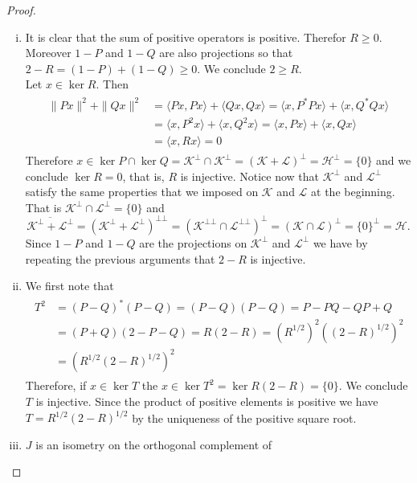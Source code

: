\begin{proof}
\begin{enumerate}[(i)]
\item It is clear that the sum of positive operators is positive. Therefor $R\geq 0$. Moreover $1-P$ and $1-Q$ are also projections so that $2-R=(1-P)+(1-Q)\geq 0$. We conclude $2\geq R$. \\
Let $x\in\ker R$. Then
\begin{align}
\begin{split}
\|Px\|^2+\|Qx\|^2&=\langle Px,Px \rangle + \langle Qx,Qx\rangle = \langle x,P^*Px\rangle +\langle x, Q^*Qx\rangle \\
&=\langle x, P^2x\rangle + \langle x, Q^2x\rangle = \langle x,Px\rangle + \langle x,Qx\rangle \\
&=\langle x,Rx\rangle = 0
\end{split}
\end{align}
Therefore $x\in\ker P\cap\ker Q=\mathcal{K}^\bot\cap\mathcal{K}^\bot=(\mathcal{K}+\mathcal{L})^\bot=\mathcal{H}^\bot=\{0\}$ and we conclude $\ker R = {0}$, that is, $R$ is injective. Notice now that $\mathcal{K}^\bot$ and $\mathcal{L}^\bot$ satisfy the same properties that we imposed on $\mathcal{K}$ and $\mathcal{L}$ at the beginning. That is $\mathcal{K}^\bot\cap\mathcal{L}^\bot=\{0\}$ and
\begin{equation}
\overline{\mathcal{K}^\bot+\mathcal{L}^\bot}=(\mathcal{K}^\bot+\mathcal{L}^\bot)^{\bot\bot}=(\mathcal{K}^{\bot\bot}\cap\mathcal{L}^{\bot\bot})^\bot = (\mathcal{K}\cap\mathcal{L})^\bot=\{0\}^\bot = \mathcal{H}.
\end{equation}
Since $1-P$ and $1-Q$ are the projections on $\mathcal{K}^\bot$ and $\mathcal{L}^\bot$ we have by repeating the previous arguments that $2-R$ is injective.
\item We first note that 
\begin{align}
\begin{split}
T^2&=(P-Q)^*(P-Q)=(P-Q)(P-Q)=P-PQ-QP+Q \\
&=(P+Q)(2-P-Q)=R(2-R)=(R^{1/2})^2((2-R)^{1/2})^2 \\
&=(R^{1/2}(2-R)^{1/2})^2
\end{split}
\end{align}
Therefore, if $x\in \ker T$ the $x\in\ker T^2=\ker R(2-R)=\{0\}$. We conclude $T$ is injective. Since the product of positive elements is positive we have $T=R^{1/2}(2-R)^{1/2}$ by the uniqueness of the positive square root.
\item $J$ is an isometry on the orthogonal complement of

\end{enumerate}
\end{proof}

